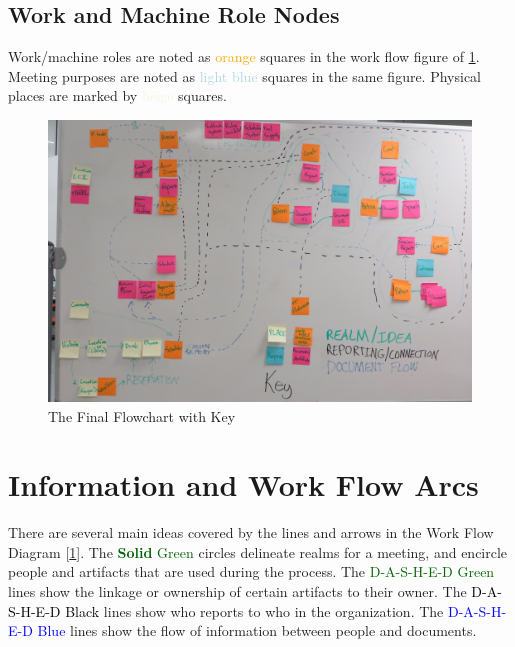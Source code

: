 \documentclass[12pt]{article} %
\begin{document}
\begin{samepage}
\section{Work and Machine Role Nodes} %
Work/machine roles are noted as \textcolor{orange}{orange} squares in the work flow figure of \ref{fig:Workflow_final}.
Meeting purposes are noted as \textcolor{lightblue}{light blue} squares in the same figure.
Physical places are marked by \textcolor{beige}{beige} squares.
  \begin{figure}[H]
    \centering
    \includegraphics[width=\linewidth]{flow/flowchart_final}
    \caption{The Final Flowchart with Key}
    \label{fig:Workflow_final}
  \end{figure}
\end{samepage}

\section{Information and Work Flow Arcs} %
There are several main ideas covered by the lines and arrows in the Work Flow Diagram [\ref{fig:Workflow_final}].
The \textcolor{darkgreen}{\textbf{Solid} Green} circles delineate realms for a meeting, and encircle people and artifacts that are used during the process.
The \textcolor{darkgreen}{D-A-S-H-E-D Green} lines show the linkage or ownership of certain artifacts to their owner.
The \textcolor{black}{D-A-S-H-E-D Black} lines show who reports to who in the organization.
The \textcolor{blue}{D-A-S-H-E-D Blue} lines show the flow of information between people and documents.
\end{document}

